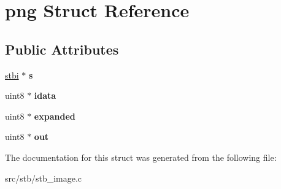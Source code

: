 \hypertarget{structpng}{}\section{png Struct Reference}
\label{structpng}
\subsection*{Public Attributes}
\begin{DoxyCompactItemize}
\item 
\mbox{\label{structpng_a77d3bfd0ae8f598a475317ed39e78fd0}} 
\hyperlink{structstbi}{stbi} $\ast$ {\bfseries s}
\item 
\mbox{\label{structpng_a5cd944fdf0f0417a344bcc538ed98ed6}} 
uint8 $\ast$ {\bfseries idata}
\item 
\mbox{\label{structpng_a474dd0da8ac0347924e68f5de7e68c55}} 
uint8 $\ast$ {\bfseries expanded}
\item 
\mbox{\label{structpng_ada33c39620ad9a647c088c40d21887f6}} 
uint8 $\ast$ {\bfseries out}
\end{DoxyCompactItemize}


The documentation for this struct was generated from the following file\+:\begin{DoxyCompactItemize}
\item 
src/stb/stb\+\_\+image.\+c\end{DoxyCompactItemize}
